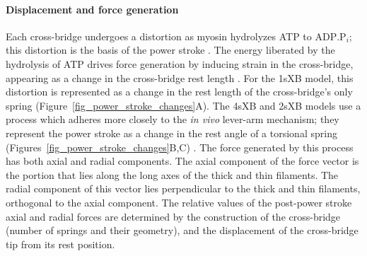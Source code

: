\documentclass[10pt]{article}
\newcommand{\citep}[1]{\cite{#1}} %
\begin{document}
\paragraph{Displacement and force generation} %
Each cross-bridge undergoes a distortion as myosin hydrolyzes ATP to $\mathrm{ADP.P}_i$; this distortion is the basis of the power stroke \citep{Pate1989, Daniel1998, Tanner2007}. 
The energy liberated by the hydrolysis of ATP drives force generation by inducing strain in the cross-bridge, appearing as a change in the cross-bridge rest length \citep{HowardBook}.  
For the 1sXB model, this distortion is represented as a change in the rest length of the cross-bridge's only spring (Figure~\ref{fig_power_stroke_changes}A). 
The 4sXB and 2sXB models use a process which adheres more closely to the \emph{in vivo} lever-arm mechanism; they represent the power stroke as a change in the rest angle of a torsional spring (Figures~\ref{fig_power_stroke_changes}B,C) \citep{Reedy2000}.
The force generated by this process has both axial and radial components. 
The axial component of the force vector is the portion that lies along the long axes of the thick and thin filaments. 
The radial component of this vector lies perpendicular to the thick and thin filaments, orthogonal to the axial component. 
The relative values of the post-power stroke axial and radial forces are determined by the construction of the cross-bridge (number of springs and their geometry), and the displacement of the cross-bridge tip from its rest position. 
\end{document}
